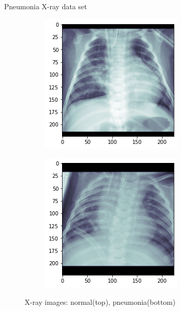 \begin{frame}{Pneumonia X-ray data set}
\begin{figure}[htbp!]
\begin{subfigure}[b]{0.3\textwidth}
     \end{subfigure} 
     \hfill
     \begin{subfigure}[b]{0.3\textwidth}
         \centering
         \includegraphics[width=\textwidth]{Images/xray_pneumonia2.png}
     \end{subfigure}
     \hfill
     \begin{subfigure}[b]{0.3\textwidth}
         \centering
         \includegraphics[width=\textwidth]{Images/xray_pneumonia5.png}
     \end{subfigure}
     \caption{X-ray images: normal(top), pneumonia(bottom)}
\end{figure}
\end{frame}
